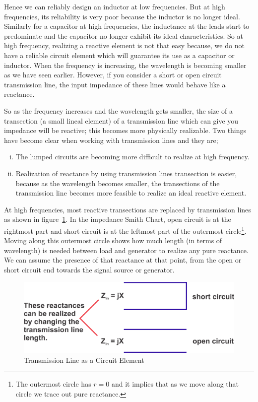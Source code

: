 Hence we can reliably design an inductor at low frequencies. But at high frequencies, its reliability is very poor because the inductor is no longer ideal. Similarly for a capacitor at high frequencies, the inductance at the leads start to predominate and the capacitor no longer exhibit its ideal characteristics. So at high frequency, realizing a reactive element is not that easy because, we do not have a reliable circuit element which will guarantee its use as a capacitor or inductor. When the frequency is increasing, the wavelength is becoming smaller as we have seen earlier. 
However, if you consider a short or open circuit transmission line, the input impedance of these lines would behave like a reactance.

So as the frequency increases and the wavelength gets smaller, the size of a transection (a small lineal element) of a transmission line which can give you impedance will be reactive; this becomes more physically realizable. Two things have become clear when working with transmission
lines and they are;
\begin{enumerate}[(i)]
\item The lumped circuits are becoming more difficult to realize at high frequency.
\item Realization of reactance by using transmission lines transection is easier, because as the wavelength becomes smaller, the transections of the transmission line becomes more feasible to realize an ideal reactive element.
\end{enumerate}
At high frequencies, most reactive transections are replaced by transmission lines as shown in figure~\ref{fig:group10diagram5}. In the impedance Smith Chart, open circuit is at the rightmost part and short circuit is at the leftmost part of the outermost circle\footnote{
The outermost circle has $r = 0$ and it implies that as we move along that circle we trace out pure reactance.
}. Moving along this outermost circle shows how much length (in terms of wavelength) is needed between load and generator to realize any pure reactance. We can assume the presence of that reactance at that point, from the open or short circuit end towards the signal source or generator.
\begin{figure}[h]
\centering
\includegraphics[width=1\linewidth]{./graphics/group10diagram5}
\caption{Transmission Line as a Circuit Element}
\label{fig:group10diagram5}
\end{figure}

